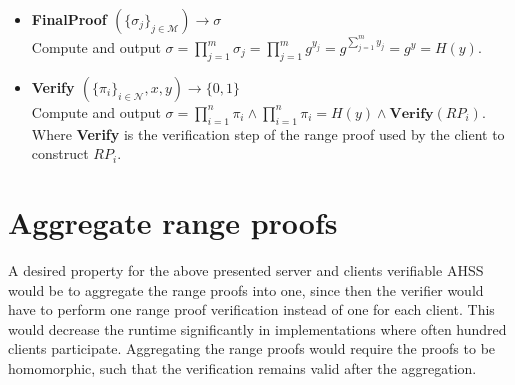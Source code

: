 \begin{algorithm}
\begin{itemize}
\item\textbf{FinalProof $(\{\sigma_j\}_{j\in\mathcal{M}})\xrightarrow[]{}\sigma$}\\
Compute and output $\sigma = \prod_{j=1}^m \sigma_j = \prod_{j=1}^m g^{y_{j}} =  g^{\sum_{j=1}^m y_{j}}= g^{y}=H(y)$.

\item\textbf{Verify $(\{\pi_i\}_{i\in\mathcal{N}},x,y)\xrightarrow[]{}\{0,1\}$}\\
Compute and output $\sigma= \prod_{i=1}^n \pi_i \wedge \prod_{i=1}^n \pi_i = H(y)\wedge \textbf{Verify}(RP_i)$. Where \textbf{Verify} is the verification step of the range proof used by the client to construct $RP_i$.
\end{itemize}
\label{alg:VAHSS-HSS-RP}
\end{algorithm}
\section{Aggregate range proofs}
A desired property for the above presented server and clients verifiable AHSS would be to aggregate the range proofs into one, since then the verifier would have to perform one range proof verification instead of one for each client. This would decrease the runtime significantly in implementations where often hundred clients participate. Aggregating the range proofs would require the proofs to be homomorphic, such that the verification remains valid after the aggregation. 

